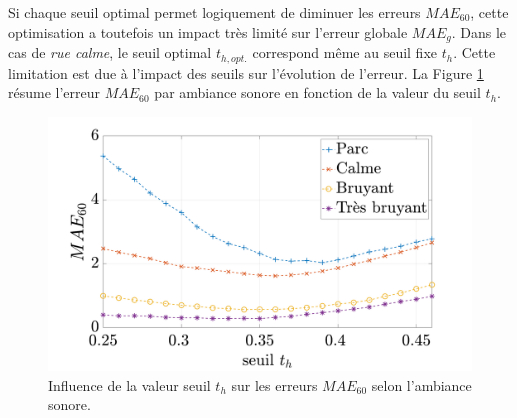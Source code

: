 \begin{table}[h]
\centering
\caption{Erreurs $MAE_{60}$ minimales selon le seuil optimal $t_{h,opt}$ par ambiance sonore, en gras les erreurs minimales.}
\label{tab:erreur_optimise}
\end{table}

Si chaque seuil optimal permet logiquement de diminuer les erreurs $MAE_{60}$, cette optimisation a toutefois un impact très limité sur l'erreur globale $MAE_g$. Dans le cas de \textit{rue calme}, le seuil optimal $t_{h,opt.}$ correspond même au seuil fixe $t_h$.
Cette limitation est due à l'impact des seuils sur l'évolution de l'erreur. La Figure \ref{fig:maeExpandSeuil} résume l'erreur $MAE_{60}$ par ambiance sonore en fonction de la valeur du seuil $t_h$. 

\begin{figure}[h]
 \centering
 \includegraphics[width=.7\linewidth]{./figures/resultats/maeExpandseuil.pdf}
 \caption{Influence de la valeur seuil $t_h$ sur les erreurs $MAE_{60}$ selon l'ambiance sonore.}
 \label{fig:maeExpandSeuil}
 \end{figure}
  

